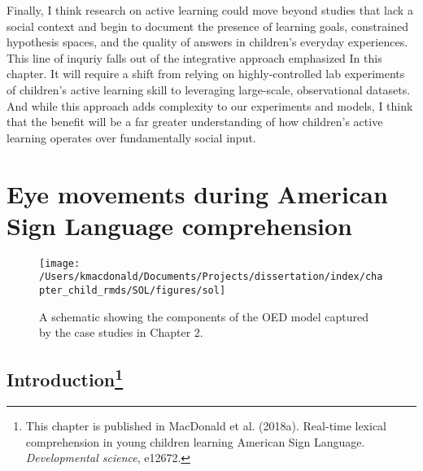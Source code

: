 \documentclass[oneside]{report}
\begin{document}
Finally, I think research on active learning could move beyond studies
that lack a social context and begin to document the presence of
learning goals, constrained hypothesis spaces, and the quality of
answers in children's everyday experiences. This line of inquriy falls
out of the integrative approach emphasized In this chapter. It will
require a shift from relying on highly-controlled lab experiments of
children's active learning skill to leveraging large-scale,
observational datasets. And while this approach adds complexity to our
experiments and models, I think that the benefit will be a far greater
understanding of how children's active learning operates over
fundamentally social input.

\hypertarget{sol}{%
\chapter{Eye movements during American Sign Language
comprehension}\label{sol}}
\begin{figure}[t]

{\centering \texttt{[image: /Users/kmacdonald/Documents/Projects/dissertation/index/chapter\_child\_rmds/SOL/figures/sol]} 

}

\caption{A schematic showing the components of the OED model captured by the case studies in Chapter 2.}\label{fig:schematic-sol}
\end{figure}
\hypertarget{introduction-1}{%
\section[Introduction]{\texorpdfstring{Introduction\footnote{This
  chapter is published in MacDonald et al. (2018a). Real-time lexical
  comprehension in young children learning American Sign Language.
  \emph{Developmental science}, e12672.}}{Introduction}}\label{introduction-1}}
\end{document}
